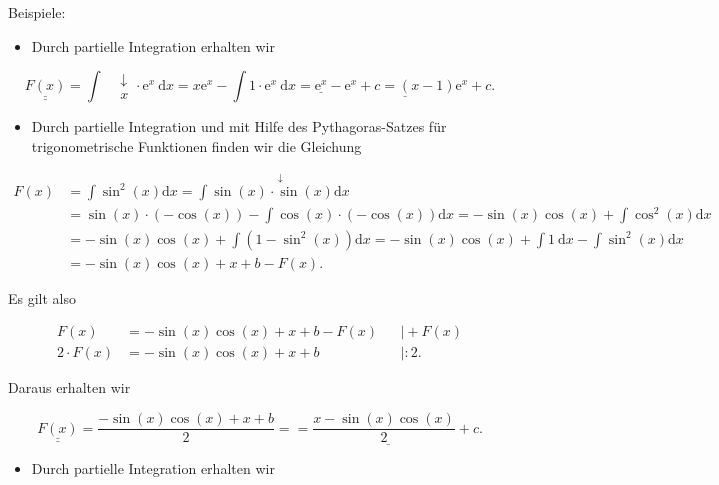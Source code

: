 \documentclass[10pt]{article}
\begin{document}
Beispiele:

\begin{itemize}
  \item Durch partielle Integration erhalten wir
\end{itemize}

\[
\underline{\underline{F(x)}}=\int \begin{align*}
& \downarrow  \tag{3.22}\\
& x
\end{align*} \cdot \mathrm{e}^{x} \mathrm{~d} x=x \mathrm{e}^{x}-\int 1 \cdot \mathrm{e}^{x} \mathrm{~d} x=\underline{\underline{\mathrm{e}^{x}}-\mathrm{e}^{x}+c=(x-1) \mathrm{e}^{x}+c .}
\]

\begin{itemize}
  \item Durch partielle Integration und mit Hilfe des Pythagoras-Satzes für trigonometrische Funktionen finden wir die Gleichung
\end{itemize}


\begin{align*}
F(x) & =\int \sin ^{2}(x) \mathrm{d} x=\int \stackrel{\downarrow}{\sin (x) \cdot \sin (x) \mathrm{d} x} \\
& =\sin (x) \cdot(-\cos (x))-\int \cos (x) \cdot(-\cos (x)) \mathrm{d} x=-\sin (x) \cos (x)+\int \cos ^{2}(x) \mathrm{d} x \\
& =-\sin (x) \cos (x)+\int\left(1-\sin ^{2}(x)\right) \mathrm{d} x=-\sin (x) \cos (x)+\int 1 \mathrm{~d} x-\int \sin ^{2}(x) \mathrm{d} x \\
& =-\sin (x) \cos (x)+x+b-F(x) . \tag{3.23}
\end{align*}


Es gilt also


\begin{align*}
F(x) & =-\sin (x) \cos (x)+x+b-F(x) & & \mid+F(x)  \tag{3.24}\\
2 \cdot F(x) & =-\sin (x) \cos (x)+x+b & & \mid: 2 . \tag{3.25}
\end{align*}


Daraus erhalten wir


\begin{equation*}
\underline{\underline{F(x)}}=\frac{-\sin (x) \cos (x)+x+b}{2}=\underline{=\frac{x-\sin (x) \cos (x)}{2}+c .} \tag{3.26}
\end{equation*}


\begin{itemize}
  \item Durch partielle Integration erhalten wir
\end{itemize}
\end{document}
